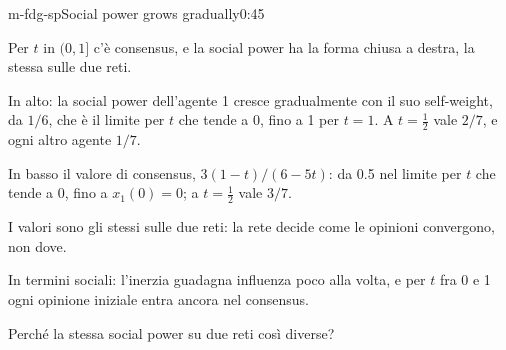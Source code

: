 \begin{slide}{m-fdg-sp}{Social power grows gradually}{0:45}
  \begin{discorso}
    \item Per $t$ in $(0,1]$ c'è consensus, e la social power ha la forma chiusa a destra, la stessa sulle due reti.
    \item In alto: la social power dell'agente 1 cresce gradualmente con il suo self-weight, da $1/6$, che è il limite per $t$ che tende a 0, fino a 1 per $t=1$. A $t=\tfrac12$ vale $2/7$, e ogni altro agente $1/7$.
    \item In basso il valore di consensus, $3(1-t)/(6-5t)$: da 0.5 nel limite per $t$ che tende a 0, fino a $x_1(0)=0$; a $t=\tfrac12$ vale $3/7$.
    \item I valori sono gli stessi sulle due reti: la rete decide come le opinioni convergono, non dove.
    \item In termini sociali: l'inerzia guadagna influenza poco alla volta, e per $t$ fra 0 e 1 ogni opinione iniziale entra ancora nel consensus.
    \item Perché la stessa social power su due reti così diverse?
  \end{discorso}
\end{slide}

